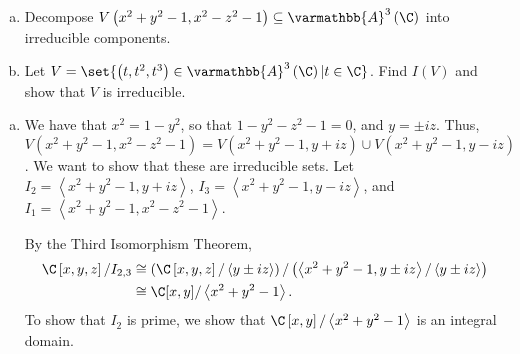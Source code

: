 \documentclass[10pt]{mypackage}
\renewcommand*{\mathbb}[1]{\varmathbb{#1}}
\newcommand{\A}{\mathbb{A}}
\begin{document}
\begin{exercise}[Exercise 1.33]\hfill
  \begin{enumerate}[(a)]
    \item Decompose $V\left( x^2 + y^2 - 1,x^2 - z^2 - 1 \right)\subseteq \A^3\left( \C \right)$ into irreducible components.
    \item Let $V = \set{\left( t,t^2,t^3 \right)\in \A^3\left( \C \right) | t\in \C}$. Find $I(V)$ and show that $V$ is irreducible.
  \end{enumerate}
\end{exercise}
\begin{solution}\hfill
  \begin{enumerate}[(a)]
    \item We have that $x^2 = 1-y^2$, so that $1-y^2 - z^2 - 1 = 0$, and $y = \pm iz$. Thus, $V\left( x^2 + y^2 - 1,x^2 - z^2 - 1 \right) = V\left( x^2 + y^2 - 1,y+iz \right)\cup V\left( x^2 + y^2 - 1,y-iz \right)$. We want to show that these are irreducible sets. Let $I_2 = \left\langle x^2 + y^2 - 1,y+iz \right\rangle$, $I_3 = \left\langle x^2+y^2-1,y-iz \right\rangle$, and $I_1 = \left\langle x^2 + y^2 - 1,x^2 - z^2 - 1 \right\rangle$.\newline

      By the Third Isomorphism Theorem,
      \begin{align*}
        \C\left[ x,y,z \right]/I_{2,3} &\cong \left( \C\left[ x,y,z \right]/\left\langle y\pm iz \right\rangle \right)/\left( \left\langle x^2 + y^2 - 1,y\pm iz \right\rangle/\left\langle y \pm iz \right\rangle \right)\\
                                       &\cong \C[x,y]/\left\langle x^2 + y^2 - 1 \right\rangle.
      \end{align*}
      To show that $I_2$ is prime, we show that $\C\left[ x,y \right]/\left\langle x^2 + y^2 - 1 \right\rangle$ is an integral domain.\newline


\end{enumerate}
\end{solution}
\end{document}
